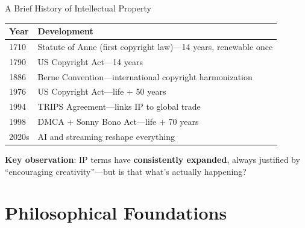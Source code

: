 ﻿\documentclass[aspectratio=169,11pt]{beamer}
\begin{document}
\begin{frame}{A Brief History of Intellectual Property}
\begin{table}[h]
\centering
\small
\begin{tabular}{l p{9cm}}
\toprule
\textbf{Year} & \textbf{Development} \\
\midrule
1710 & Statute of Anne (first copyright law)---14 years, renewable once \\
1790 & US Copyright Act---14 years \\
1886 & Berne Convention---international copyright harmonization \\
1976 & US Copyright Act---life + 50 years \\
1994 & TRIPS Agreement---links IP to global trade \\
1998 & DMCA + Sonny Bono Act---life + 70 years \\
2020s & AI and streaming reshape everything \\
\bottomrule
\end{tabular}
\end{table}

\vspace{0.2cm}
\textbf{Key observation}: IP terms have \textbf{consistently expanded}, always justified by ``encouraging creativity''---but is that what's actually happening?
\end{frame}


\section{Philosophical Foundations}

\end{document}
